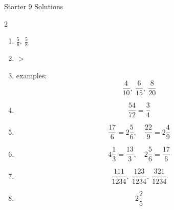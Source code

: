 \documentclass{beamer}
\begin{document}
\begin{frame}{Starter 9 Solutions}

\begin{multicols}{2}

\begin{enumerate}

\item $\frac{5}{6},\ \frac{5}{8}$

\item $>$

\item examples:
\[
\frac{4}{10},\ \frac{6}{15},\ \frac{8}{20}
\]

\item 
\[
\frac{54}{72}=\frac{3}{4}
\]

\item 
\[
\frac{17}{6}=2\frac{5}{6},\quad
\frac{22}{9}=2\frac{4}{9}
\]

\columnbreak

\item 
\[
4\frac{1}{3}=\frac{13}{3},\quad
2\frac{5}{6}=\frac{17}{6}
\]

\item 
\[
\frac{111}{1234},\ \frac{123}{1234},\ \frac{321}{1234}
\]

\item 
\[
2\frac{2}{5}
\]

\end{enumerate}

\end{multicols}

\end{frame}
\end{document}
